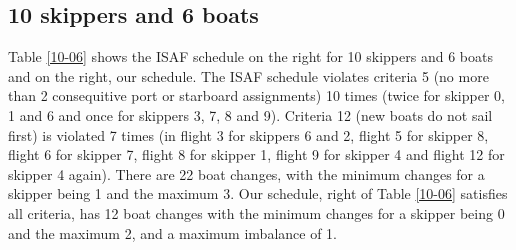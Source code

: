 \documentclass{llncs}
\begin{document}
\subsection{10 skippers and 6 boats}
Table \ref{10-06} shows the ISAF schedule on the right for 10 skippers and 6 boats and on the right, our schedule.  The ISAF schedule violates criteria 5 (no more than 2 consequitive port or starboard assignments) 10 times (twice for skipper 0, 1 and 6 and once for skippers 3, 7, 8 and 9).  Criteria 12 (new boats do not sail first) is violated 7 times (in flight 3 for skippers 6 and 2, flight 5 for skipper 8, flight 6 for skipper 7, flight 8 for skipper 1, flight 9 for skipper 4 and flight 12 for skipper 4 again). There are 22 boat changes, with the minimum changes for a skipper being 1 and the maximum 3. Our schedule, right of Table \ref{10-06} satisfies all criteria, has 12 boat changes with the minimum changes for a skipper being 0 and the maximum 2, and a maximum imbalance of 1.
\end{document}
